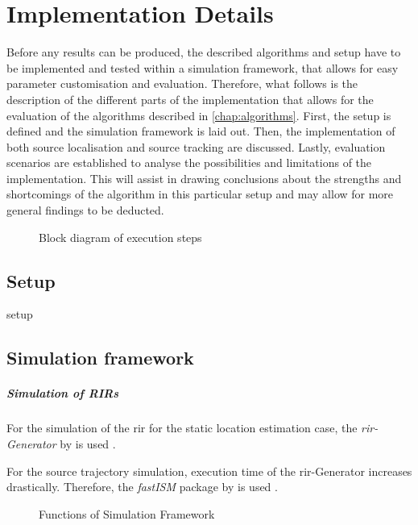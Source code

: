 \chapter{Implementation Details}
\label{chap:implementation}
Before any results can be produced, the described algorithms and setup have to be implemented and tested within a simulation framework, that allows for easy parameter customisation and evaluation. Therefore, what follows is the description of the different parts of the implementation that allows for the evaluation of the algorithms described in \ref{chap:algorithms}. First, the setup is defined and the simulation framework is laid out. Then, the implementation of both source localisation and source tracking are discussed. Lastly, evaluation scenarios are established to analyse the possibilities and limitations of the implementation. This will assist in drawing conclusions about the strengths and shortcomings of the algorithm in this particular setup and may allow for more general findings to be deducted.

\begin{figure}[H]
	\centering
	
	\caption{Block diagram of execution steps}
	\label{diag:execBlocks}
\end{figure}


\section{Setup}
\label{sec:setup}
{setup}

\section{Simulation framework}


\paragraph{Simulation of RIRs}
For the simulation of the \gls{rir} for the static location estimation case, the \emph{\gls{rir}-Generator} by \citeauthor{Habets2014} is used \cite{Habets2014}.

For the source trajectory simulation, execution time of the \gls{rir}-Generator increases drastically. Therefore, the \emph{fastISM} package by \citeauthor{Lehmann2010} is used \cite{Lehmann2010}.
\begin{figure}[H]
	\centering
	
	\caption{Functions of Simulation Framework}
	\label{diag:simulationFramework}
\end{figure}

